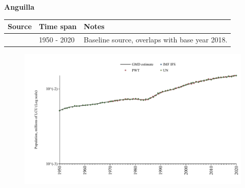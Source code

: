 \documentclass[12pt,a4paper,landscape]{article}
\begin{document}
\begin{adjustbox}{max totalsize={\paperwidth}{\paperheight},center}
\begin{minipage}[t][\textheight][t]{\textwidth}
\vspace*{0.5cm}
{}
\begin{center}
{\Large\bfseries Anguilla}
\end{center}
\vspace{0.5cm}
\begin{table}[H]
\centering
\small
\begin{tabular}{|l|l|l|}
\hline
\textbf{Source} & \textbf{Time span} & \textbf{Notes} \\
\hline
\rowcolor{white}\cite{IMF_IFS}& 1950 - 2020 &Baseline source, overlaps with base year 2018.\\
\hline
\end{tabular}
\end{table}
\begin{figure}[H]
\centering
\includegraphics[width=\textwidth,height=0.6\textheight,keepaspectratio]{graphs/AIA_pop.pdf}
\end{figure}
\end{minipage}
\end{adjustbox}
\end{document}
